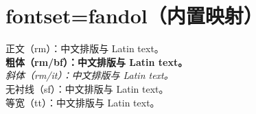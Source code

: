 \documentclass[fontset = fandol, 12pt]{ctexart}
\begin{document}
\section*{fontset=fandol（内置映射）}

\noindent\rmfamily
正文（rm）：中文排版与 Latin text。\\[.7em]
\textbf{粗体（rm/bf）：中文排版与 Latin text。}\\[.7em]
\textit{斜体（rm/it）：中文排版与 Latin text。}\\[.7em]
\sffamily 无衬线（sf）：中文排版与 Latin text。\\[.7em]
\ttfamily 等宽（tt）：中文排版与 Latin text。
\end{document}
